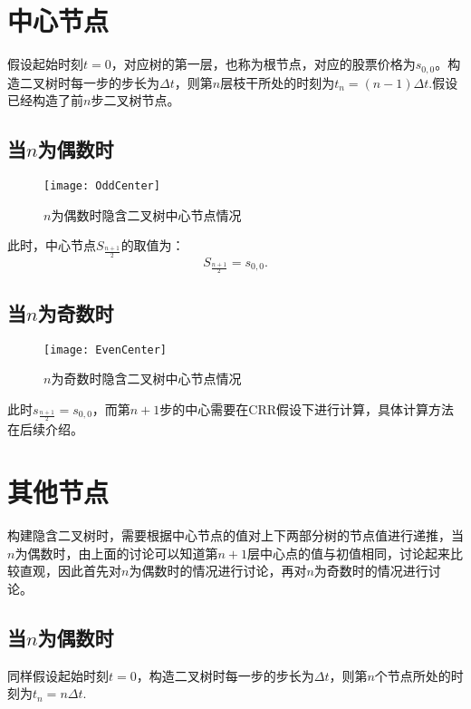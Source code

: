 \section{中心节点}
假设起始时刻$t = 0$，对应树的第一层，也称为根节点，对应的股票价格为$s_{0,0}$。构造二叉树时每一步的步长为$\Delta t$，则第$n$层枝干所处的时刻为$t_n = (n-1)\Delta t$.假设已经构造了前$n$步二叉树节点。

\subsection{当$n$为偶数时}
\begin{figure}[H]
	\centering
	\texttt{[image: OddCenter]}
	\caption{$n$为偶数时隐含二叉树中心节点情况}
\end{figure}
此时，中心节点$S_{\frac{n+1}{2}}$的取值为：
$$S_{\frac{n+1}{2}} = s_{0,0}.$$
\subsection{当$n$为奇数时}
\begin{figure}[H]
	\centering
	\texttt{[image: EvenCenter]}
	\caption{$n$为奇数时隐含二叉树中心节点情况}
\end{figure}
此时$s_{\frac{n+1}{2}} = s_{0,0}$，而第$n+1$步的中心需要在CRR假设下进行计算，具体计算方法在后续介绍。

\section{其他节点}
构建隐含二叉树时，需要根据中心节点的值对上下两部分树的节点值进行递推，当$n$为偶数时，由上面的讨论可以知道第$n+1$层中心点的值与初值相同，讨论起来比较直观，因此首先对$n$为偶数时的情况进行讨论，再对$n$为奇数时的情况进行讨论。
\subsection{当$n$为偶数时}
同样假设起始时刻$t = 0$，构造二叉树时每一步的步长为$\Delta t$，则第$n$个节点所处的时刻为$t_n = n\Delta t$.


